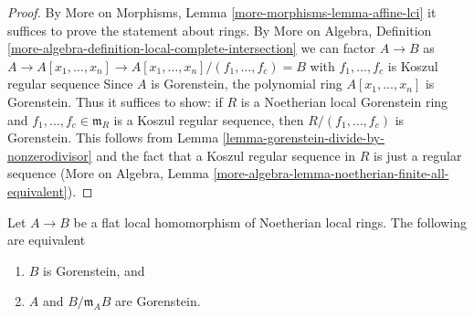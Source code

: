 \begin{proof}
By More on Morphisms, Lemma \ref{more-morphisms-lemma-affine-lci}
it suffices to prove the statement about rings.
By More on Algebra, Definition
\ref{more-algebra-definition-local-complete-intersection}
we can factor $A \to B$ as
$A \to A[x_1, \ldots, x_n] \to
A[x_1, \ldots, x_n]/(f_1, \ldots, f_c) = B$
with $f_1, \ldots, f_c$ is Koszul regular sequence
Since $A$ is Gorenstein, the polynomial ring
$A[x_1, \ldots, x_n]$ is Gorenstein.
Thus it suffices to show: if $R$ is a Noetherian local
Gorenstein ring and $f_1, \ldots, f_c \in \mathfrak m_R$
is a Koszul regular sequence, then $R/(f_1, \ldots, f_c)$
is Gorenstein. This follows from
Lemma \ref{lemma-gorenstein-divide-by-nonzerodivisor} and
the fact that a Koszul regular sequence in $R$ is just a
regular sequence (More on Algebra, Lemma
\ref{more-algebra-lemma-noetherian-finite-all-equivalent}).
\end{proof}

\begin{lemma}
\label{lemma-flat-under-gorenstein}
Let $A \to B$ be a flat local homomorphism of Noetherian local rings.
The following are equivalent
\begin{enumerate}
\item $B$ is Gorenstein, and
\item $A$ and $B/\mathfrak m_A B$ are Gorenstein.
\end{enumerate}
\end{lemma}


